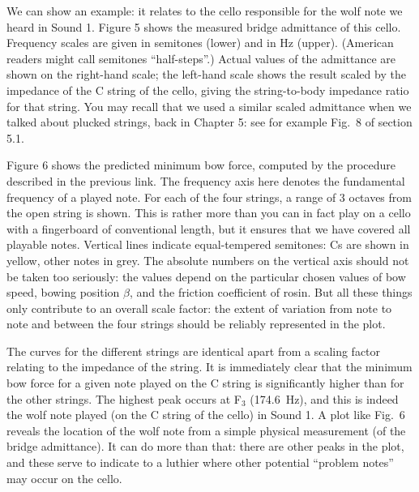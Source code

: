   We can show an example: it relates to the cello responsible for the wolf note 
  we heard in Sound 1. Figure 5 shows the measured bridge admittance of this 
  cello. Frequency scales are given in semitones (lower) and in Hz (upper). 
  (American readers might call semitones ``half-steps''.) Actual values of the 
  admittance are shown on the right-hand scale; the left-hand scale shows the 
  result scaled by the impedance of the C string of the cello, giving the 
  string-to-body impedance ratio for that string. You may recall that we used a 
  similar scaled admittance when we talked about plucked strings, back in 
  Chapter 5: see for example Fig.\ 8 of section 5.1. 


  Figure 6 shows the predicted minimum bow force, computed by the procedure 
  described in the previous link. The frequency axis here denotes the 
  fundamental frequency of a played note. For each of the four strings, a range 
  of 3 octaves from the open string is shown. This is rather more than you can 
  in fact play on a cello with a fingerboard of conventional length, but it 
  ensures that we have covered all playable notes. Vertical lines indicate 
  equal-tempered semitones: Cs are shown in yellow, other notes in grey. The 
  absolute numbers on the vertical axis should not be taken too seriously: the 
  values depend on the particular chosen values of bow speed, bowing position 
  $\beta$, and the friction coefficient of rosin. But all these things only 
  contribute to an overall scale factor: the extent of variation from note to 
  note and between the four strings should be reliably represented in the plot. 


  The curves for the different strings are identical apart from a scaling 
  factor relating to the impedance of the string. It is immediately clear that 
  the minimum bow force for a given note played on the C string is 
  significantly higher than for the other strings. The highest peak occurs at 
  F$_3$ (174.6~Hz), and this is indeed the wolf note played (on the C string of 
  the cello) in Sound 1. A plot like Fig.\ 6 reveals the location of the wolf 
  note from a simple physical measurement (of the bridge admittance). It can do 
  more than that: there are other peaks in the plot, and these serve to 
  indicate to a luthier where other potential ``problem notes'' may occur on 
  the cello. 

